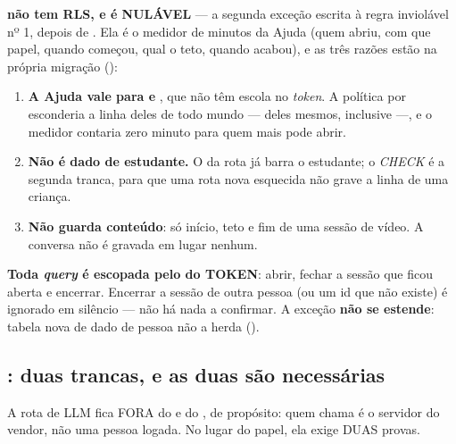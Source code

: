 \begin{regra}
\textbf{ não tem RLS, e  é NULÁVEL} --- a
segunda exceção escrita à regra inviolável nº 1, depois de
. Ela é o medidor de minutos da Ajuda (quem abriu, com que
papel, quando começou, qual o teto, quando acabou), e as três razões estão na
própria migração ():
\begin{enumerate}
  \item \textbf{A Ajuda vale para  e }, que não têm
    escola no \emph{token}. A política por  esconderia a linha
    deles de todo mundo --- deles mesmos, inclusive ---, e o medidor contaria
    zero minuto para quem mais pode abrir.
  \item \textbf{Não é dado de estudante.} O  da rota já barra o
    estudante; o \emph{CHECK}  é a segunda tranca,
    para que uma rota nova esquecida não grave a linha de uma criança.
  \item \textbf{Não guarda conteúdo}: só início, teto e fim de uma sessão de
    vídeo. A conversa não é gravada em lugar nenhum.
\end{enumerate}
\textbf{Toda \emph{query} é escopada pelo  do TOKEN}: abrir,
fechar a sessão que ficou aberta e encerrar. Encerrar a sessão de outra pessoa
(ou um id que não existe) é ignorado em silêncio --- não há nada a confirmar.
A exceção \textbf{não se estende}: tabela nova de dado de pessoa não a herda
().
\end{regra}

\subsection{: duas trancas, e as duas são necessárias}

A rota de LLM fica FORA do  e do , de propósito:
quem chama é o servidor do vendor, não uma pessoa logada. No lugar do papel, ela
exige DUAS provas.

